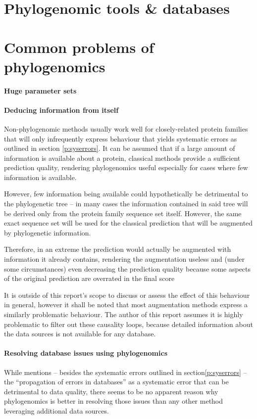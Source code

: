 \documentclass[pdftex,paper=A4,DIV=calc,titlepage,12pt]{scrartcl}
\newtheorem[L]{boxedDefinition}{Definition}
\begin{document}
\section{Phylogenomic tools \& databases}

\section{Common problems of phylogenomics}\label{sec:problems}

\paragraph{Huge parameter sets}


\paragraph{Deducing information from itself}\label{p:self-deduction}
Non-phylogenomic methods usually work well for closely-related protein families that will only infrequently express behaviour that yields systematic errors as outlined in section \vref{p:syserrors}. It can be assumed that if a large amount of information is available about a protein, classical methods provide a sufficient prediction quality, rendering phylogenomics useful especially for cases where few information is available.

However, few information being available could hypothetically be detrimental to the phylogenetic tree -- in many cases the information contained in said tree will be derived only from the protein family sequence set itself. However, the same exact sequence set will be used for the classical prediction that will be augmented by phylogenetic information.

Therefore, in an extreme the prediction would actually be augmented with information it already contains, rendering the augmentation useless and (under some circumstances) even decreasing the prediction quality because some aspects of the original prediction are overrated in the final score

It is outside of this report's scope to discuss or assess the effect of this behaviour in general, however it shall be noted that most augmentation methods express a similarly problematic behaviour. The author of this report assumes it is highly problematic to filter out these causality loops, because detailed information about the data sources is not available for any database.

\paragraph{Resolving database issues using phylogenomics}
While \cite{brown2006functional} mentions -- besides the systematic errors outlined in section\vref{p:syserrors} -- the ``propagation of errors in databases'' as a systematic error that can be detrimental to data quality, there seems to be no apparent reason why phylogenomics is better in resolving those issues than any other method leveraging additional data sources.
\end{document}
